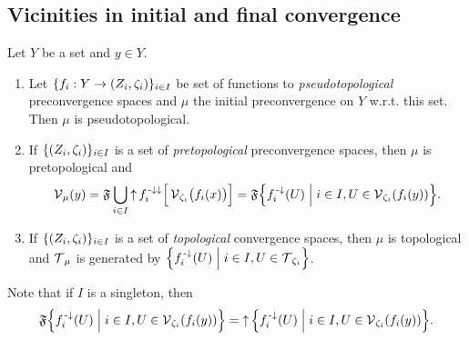 \subsection{Vicinities in initial and final convergence}
\begin{proposition} \label{pretopologicalInitialConvergence}
Let $Y$ be a set and $y\in Y$.
\begin{enumerate}
\item Let $\{f_i: Y\to \sSet{Z_i, \zeta_i}\}_{i\in I}$ be set of functions to \emph{pseudotopological} preconvergence spaces and $\mu$ the initial preconvergence on $Y$ w.r.t. this set. Then $\mu$ is pseudotopological.
\item If $\{\sSet{Z_i, \zeta_i}\}_{i\in I}$ is a set of \emph{pretopological} preconvergence spaces, then $\mu$ is pretopological and
\[ \vicinities_\mu(y) = \mathfrak{F}\bigcup_{i\in I} \upset f_i^{\preimf\imf}\Big[\vicinities_{\zeta_i}\!\big(f_i(x)\big)\Big] = \mathfrak{F}\setbuilder{f_i^\preimf(U)}{i\in I, U\in \vicinities_{\zeta_i}(f_i(y))}. \]
\item If $\{\sSet{Z_i, \zeta_i}\}_{i\in I}$ is a set of \emph{topological} convergence spaces, then $\mu$ is topological and $\operatorname{\mathcal{T}}_\mu$ is generated by $\setbuilder{f_i^\preimf(U)}{i\in I, U\in \topology_{\zeta_i}}$.
\end{enumerate}
\end{proposition}
Note that if $I$ is a singleton, then
\[ \mathfrak{F}\setbuilder{f_i^\preimf(U)}{i\in I, U\in \vicinities_{\zeta_i}(f_i(y))} = \upset\setbuilder{f_i^\preimf(U)}{i\in I, U\in \vicinities_{\zeta_i}(f_i(y))}. \]
